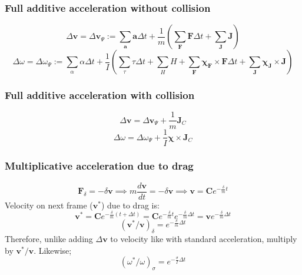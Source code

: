 \documentclass[10pt]{report}
\begin{document}
\subsubsection{Full additive acceleration without collision}
\begin{equation}\Delta\boldsymbol{v}=\Delta\boldsymbol{v}_\Psi:=\sum_{\boldsymbol{a}}\boldsymbol{a}\Delta t+\frac{1}{m}\left(\sum_{\boldsymbol{F}}\boldsymbol{F}\Delta t+\sum_{\boldsymbol{J}}\boldsymbol{J}\right)\end{equation}
\begin{equation}\Delta\omega=\Delta\omega_\Psi:=\sum_\alpha\alpha\Delta t+\frac{1}{I}\left(\sum_\tau\tau\Delta t+\sum_HH+\sum_{\boldsymbol{F}}\boldsymbol{\chi_{\boldsymbol{F}}}\times{\boldsymbol{F}}\Delta t+\sum_{\boldsymbol{J}}\boldsymbol{\chi_{\boldsymbol{J}}}\times{\boldsymbol{J}}\right)\end{equation}

\subsubsection{Full additive acceleration with collision}
\begin{equation}\Delta\boldsymbol{v}=\Delta\boldsymbol{v}_\Psi+\frac{1}{m}\boldsymbol{J}_C\end{equation}
\begin{equation}\Delta\omega=\Delta\omega_\Psi+\frac{1}{I}\boldsymbol{\chi}\times\boldsymbol{J}_C\end{equation}

\subsubsection{Multiplicative acceleration due to drag}
\begin{equation}\boldsymbol{F}_\delta=-\delta\boldsymbol{v}\implies m\frac{d\boldsymbol{v}}{dt}=-\delta\boldsymbol{v}\implies\boldsymbol{v}=\boldsymbol{C}e^{-\frac{\delta}{m}t}\end{equation}
Velocity on next frame ($\boldsymbol{v}^*$) due to drag is:
\begin{equation}\boldsymbol{v}^*=\boldsymbol{C}e^{-\frac{\delta}{m}(t+\Delta t)}=\boldsymbol{C}e^{-\frac{\delta}{m}t}e^{-\frac{\delta}{m}\Delta t}=\boldsymbol{v}e^{-\frac{\delta}{m}\Delta t}\end{equation}
\begin{equation}(\boldsymbol{v}^*/\boldsymbol{v})_\delta=e^{-\frac{\delta}{m}\Delta t}\end{equation}
Therefore, unlike adding $\Delta\boldsymbol{v}$ to velocity like with standard acceleration, multiply by $\boldsymbol{v}^*/\boldsymbol{v}$. Likewise;
\begin{equation}(\omega^*/\omega)_\sigma=e^{-\frac{\sigma}{I}\Delta t}\end{equation}
\end{document}
